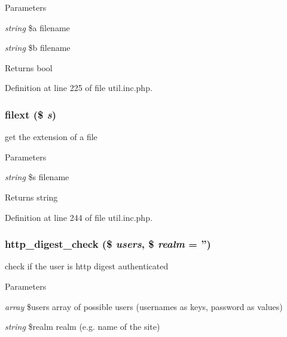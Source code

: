 \begin{DoxyParams}{Parameters}
\item[{\em string}]\$a filename \item[{\em string}]\$b filename \end{DoxyParams}
\begin{DoxyReturn}{Returns}
bool 
\end{DoxyReturn}


Definition at line 225 of file util.inc.php.

\hypertarget{util_8inc_8php_a6d9392e51344c2e8720a0c1982ebea21}{
\subsubsection[{filext}]{\setlength{\rightskip}{0pt plus 5cm}filext (\$ {\em s})}}
\label{util_8inc_8php_a6d9392e51344c2e8720a0c1982ebea21}
get the extension of a file


\begin{DoxyParams}{Parameters}
\item[{\em string}]\$s filename \end{DoxyParams}
\begin{DoxyReturn}{Returns}
string 
\end{DoxyReturn}


Definition at line 244 of file util.inc.php.

\hypertarget{util_8inc_8php_aff065fbc9f3abbf9c5a0ebfba22acbf7}{
\subsubsection[{http\_\-digest\_\-check}]{\setlength{\rightskip}{0pt plus 5cm}http\_\-digest\_\-check (\$ {\em users}, \/  \$ {\em realm} = {\ttfamily ''})}}
\label{util_8inc_8php_aff065fbc9f3abbf9c5a0ebfba22acbf7}
check if the user is http digest authenticated


\begin{DoxyParams}{Parameters}
\item[{\em array}]\$users array of possible users (usernames as keys, password as values) \item[{\em string}]\$realm realm (e.g. name of the site) \end{DoxyParams}

